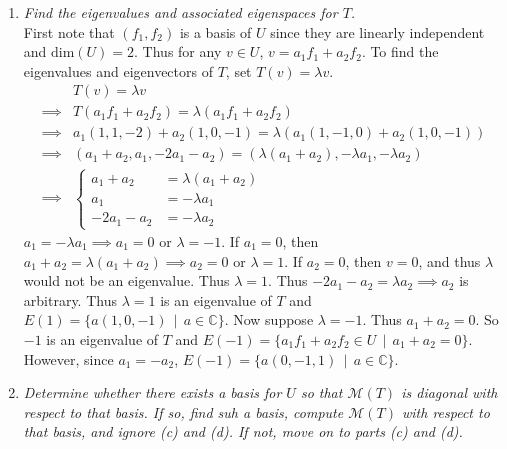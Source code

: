 \documentclass[12pt]{article}
\newcommand{\suchthat}{\, \mid \,}
\begin{document}
\begin{enumerate}[\ \ \it(a)\ \ ]
	\item {\it Find the eigenvalues and associated eigenspaces for $T$.} \\

	\noindent First note that $(f_1, f_2)$ is a basis of $U$ since they are linearly independent and $\text{dim}(U) = 2$.  Thus for any $v \in U$, $v = a_1f_1 + a_2f_2$.  To find the eigenvalues and eigenvectors of $T$, set $T(v) = \lambda v$.
	\begin{align*}
		&T(v) = \lambda v \\
		\implies &T(a_1f_1 + a_2f_2) = \lambda(a_1f_1 + a_2f_2) \\
		\implies &a_1(1, 1, -2) + a_2(1, 0, -1) = \lambda(a_1(1, -1, 0) + a_2(1, 0, -1)) \\
		\implies &(a_1 + a_2, a_1, -2a_1 - a_2) = (\lambda(a_1 + a_2), -\lambda a_1, -\lambda a_2) \\
		\implies &\left\{\begin{array}{rl}
			a_1 + a_2 & = \lambda(a_1 + a_2) \\
			a_1 & = -\lambda a_1 \\
			-2a_1 - a_2 & = -\lambda a_2
		\end{array}\right.
	\end{align*}
	$a_1 = -\lambda a_1 \implies a_1 = 0$ or $\lambda = -1$.  If $a_1 = 0$, then $a_1 + a_2 = \lambda(a_1 + a_2) \implies a_2 = 0$ or $\lambda = 1$.  If $a_2 = 0$, then $v = 0$, and thus $\lambda$ would not be an eigenvalue.  Thus $\lambda = 1$.  Thus $-2a_1 - a_2 = \lambda a_2 \implies a_2$ is arbitrary.  Thus $\lambda = 1$ is an eigenvalue of $T$ and $E(1) = \{a(1, 0, -1) \suchthat a \in \mathbb{C}\}$.  Now suppose $\lambda = -1$.  Thus $a_1 + a_2 = 0$.  So $-1$ is an eigenvalue of $T$ and $E(-1) = \{a_1f_1 + a_2f_2 \in U \suchthat a_1 + a_2 = 0\}$.  However, since $a_1 = -a_2$, $E(-1) = \{a(0, -1, 1) \suchthat a \in \mathbb{C}\}$.
	\item {\it Determine whether there exists a basis for $U$ so that $\mathcal{M}(T)$ is diagonal with respect to that basis.  If so, find suh a basis, compute $\mathcal{M}(T)$ with respect to that basis, and ignore (c) and (d).  If not, move on to parts (c) and (d).} \\


\end{enumerate}
\end{document}

